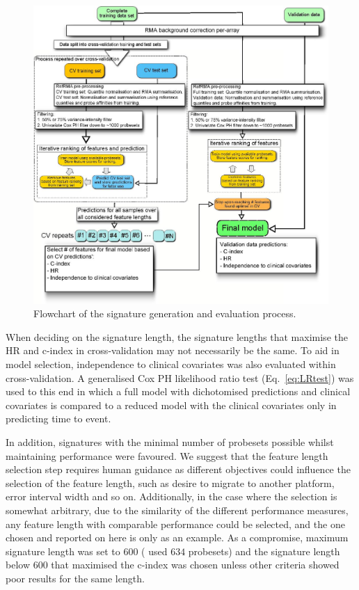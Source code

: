 \documentclass[letterpaper,12pt]{article}
\begin{document}
\begin{figure}[!th]
\centering
\includegraphics[scale=0.30]{Figures/WorkflowOverview.jpeg}
\caption{Flowchart of the signature generation and evaluation process.}
\label{Fig:SignGenFlowchart}
\end{figure}

When deciding on the signature length, the signature lengths that maximise the HR and c-index in cross-validation may not necessarily be the same. To aid in model selection, independence to clinical covariates was also evaluated within cross-validation. A generalised Cox PH likelihood ratio test (Eq.\ \ref{eq:LRtest}) was used to this end in which a full model with dichotomised predictions and clinical covariates is compared to a reduced model with the clinical covariates only in predicting time to event. 

In addition, signatures with the minimal number of probesets possible whilst maintaining performance were favoured. We suggest that the feature length selection step requires human guidance as different objectives could influence the selection of the feature length, such as desire to migrate to another platform, error interval width and so on.  Additionally, in the case where the selection is somewhat arbitrary, due to the similarity of the different performance measures, any feature length with comparable performance could be selected, and the one chosen and reported on here is only as an example. As a compromise, maximum signature length was set to $600$ (\citet{Kennedy:11} used $634$ probesets) and the signature length below $600$ that maximised the c-index was chosen unless other criteria showed poor results for the same length.
\end{document}
